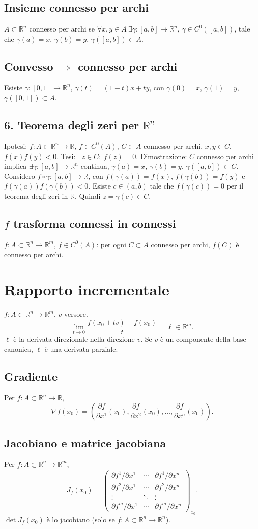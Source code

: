 \documentclass[11pt,a4paper]{article}
\newcommand{\R}{\mathbb R}\newcommand{\N}{\mathbb N}\newcommand{\pagina}[1]{\clearpage}
\begin{document}
\subsection*{Insieme connesso per archi}
$A\subset\R^n$ connesso per archi se $\forall x,y\in A\ \exists\gamma:[a,b]\to\R^n$, $\gamma\in C^0([a,b])$, tale che $\gamma(a)=x$, $\gamma(b)=y$, $\gamma([a,b])\subset A$.
\pagina{19}
\subsection*{Convesso $\Rightarrow$ connesso per archi}
Esiste $\gamma:[0,1]\to\R^n$, $\gamma(t)=(1-t)x+ty$, con $\gamma(0)=x$, $\gamma(1)=y$, $\gamma([0,1])\subset A$.
\subsection*{6. Teorema degli zeri per $\R^n$}
Ipotesi: $f:A\subset\R^n\to\R$, $f\in C^0(A)$, $C\subset A$ connesso per archi, $x,y\in C$, $f(x)f(y)<0$.
Tesi: $\exists z\in C:\ f(z)=0$.
Dimostrazione: $C$ connesso per archi implica $\exists\gamma:[a,b]\to\R^n$ continua, $\gamma(a)=x$, $\gamma(b)=y$, $\gamma([a,b])\subset C$.
Considero $f\circ\gamma:[a,b]\to\R$, con $f(\gamma(a))=f(x)$, $f(\gamma(b))=f(y)$ e $f(\gamma(a))f(\gamma(b))<0$.
Esiste $c\in(a,b)$ tale che $f(\gamma(c))=0$ per il teorema degli zeri in $\R$. Quindi $z=\gamma(c)\in C$.
\subsection*{$f$ trasforma connessi in connessi}
$f:A\subset\R^n\to\R^m$, $f\in C^0(A)$: per ogni $C\subset A$ connesso per archi, $f(C)$ è connesso per archi.
\pagina{20}
\section*{Rapporto incrementale}
$f:A\subset\R^n\to\R^m$, $v$ versore.
\[\lim_{t\to0}\frac{f(x_0+tv)-f(x_0)}t=\ell\in\R^m.\]
$\ell$ è la derivata direzionale nella direzione $v$. Se $v$ è un componente della base canonica, $\ell$ è una derivata parziale.
\subsection*{Gradiente}
Per $f:A\subset\R^n\to\R$,
\[\nabla f(x_0)=\left(\frac{\partial f}{\partial x^1}(x_0),\frac{\partial f}{\partial x^2}(x_0),\ldots,\frac{\partial f}{\partial x^n}(x_0)\right).\]
\subsection*{Jacobiano e matrice jacobiana}
Per $f:A\subset\R^n\to\R^m$,
\[J_f(x_0)=\begin{pmatrix}\partial f^1/\partial x^1&\cdots&\partial f^1/\partial x^n\\\partial f^2/\partial x^1&\cdots&\partial f^2/\partial x^n\\\vdots&\ddots&\vdots\\\partial f^m/\partial x^1&\cdots&\partial f^m/\partial x^n\end{pmatrix}_{x_0}.\]
$\det J_f(x_0)$ è lo jacobiano (solo se $f:A\subset\R^n\to\R^n$).
\end{document}
